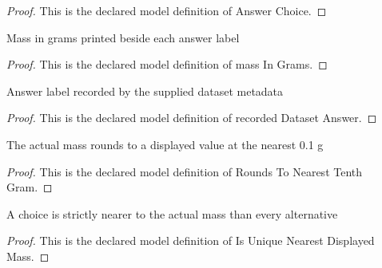 \begin{proof}
  This is the declared model definition of Answer Choice.
\end{proof}
\begin{definition}
  \label{def:physics:phyx-mini-0906:phyxminiproblems-problemphyxmini0906-answerchoice-massingrams}
  Mass in grams printed beside each answer label
\end{definition}
\begin{proof}
  This is the declared model definition of mass In Grams.
\end{proof}
\begin{definition}
  \label{def:physics:phyx-mini-0906:phyxminiproblems-problemphyxmini0906-recordeddatasetanswer}
  Answer label recorded by the supplied dataset metadata
\end{definition}
\begin{proof}
  This is the declared model definition of recorded Dataset Answer.
\end{proof}
\begin{definition}
  \label{def:physics:phyx-mini-0906:phyxminiproblems-problemphyxmini0906-roundstonearesttenthgram}
  The actual mass rounds to a displayed value at the nearest 0.1 g
\end{definition}
\begin{proof}
  This is the declared model definition of Rounds To Nearest Tenth Gram.
\end{proof}
\begin{definition}
  \label{def:physics:phyx-mini-0906:phyxminiproblems-problemphyxmini0906-isuniquenearestdisplayedmass}
  A choice is strictly nearer to the actual mass than every alternative
\end{definition}
\begin{proof}
  This is the declared model definition of Is Unique Nearest Displayed Mass.
\end{proof}
